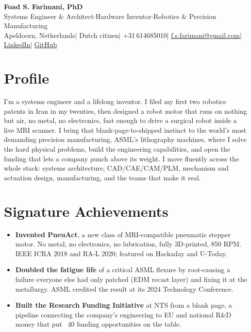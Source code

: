 \documentclass[10pt,a4paper]{article}
\begin{document}
\begin{center}
  {\LARGE\bfseries Foad S. Farimani, PhD} \\[3pt]
  {\small Systems Engineer \& Architect\enspace$\cdot$\enspace Hardware Inventor\enspace$\cdot$\enspace Robotics \& Precision Manufacturing}
  \\[3pt]
  {\footnotesize
    Apeldoorn, Netherlands\enspace$\mid$\enspace
    Dutch citizen\enspace$\mid$\enspace
    +31\,614685010\enspace$\mid$\enspace
    \href{mailto:f.s.farimani@gmail.com}{f.s.farimani@gmail.com}\enspace$\mid$\enspace
    \href{https://linkedin.com/in/fsfarimani}{LinkedIn}\enspace$\mid$\enspace
    \href{https://github.com/Foadsf}{GitHub}
  }
\end{center}

\section{Profile}
I'm a systems engineer and a lifelong inventor. I filed my first two robotics patents in Iran in my twenties, then designed a robot motor that runs on nothing but air, no metal, no electronics, fast enough to drive a surgical robot inside a live MRI scanner. I bring that blank-page-to-shipped instinct to the world's most demanding precision manufacturing, ASML's lithography machines, where I solve the hard physical problems, build the engineering capabilities, and open the funding that lets a company punch above its weight. I move fluently across the whole stack: systems architecture, CAD/CAE/CAM/PLM, mechanism and actuation design, manufacturing, and the teams that make it real.

\section{Signature Achievements}
\begin{itemize}
  \item \textbf{Invented PneuAct}, a new class of MRI-compatible pneumatic stepper motor. No metal, no electronics, no lubrication, fully 3D-printed, 850 RPM. IEEE ICRA 2018 and RA-L 2020; featured on Hackaday and U-Today.
  \item \textbf{Doubled the fatigue life} of a critical ASML flexure by root-causing a failure everyone else had only patched (EDM recast layer) and fixing it at the metallurgy. ASML credited the result at its 2024 Technology Conference.
  \item \textbf{Built the Research Funding Initiative} at NTS from a blank page, a pipeline connecting the company's engineering to EU and national R\&D money that put ~40 funding opportunities on the table.
\end{itemize}
\end{document}
